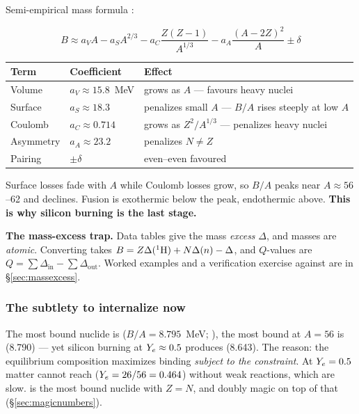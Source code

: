 Semi-empirical mass formula \citep[][this coefficient set is the least-squares
fit of \citealt{eisberg1985}]{krane1988}:

\begin{equation*}
B \approx a_V A - a_S A^{2/3} - a_C \frac{Z(Z-1)}{A^{1/3}}
        - a_A \frac{(A-2Z)^2}{A} \pm \delta
\end{equation*}

\begin{center}
\small
\begin{tabularx}{\textwidth}{@{}l l Y@{}}
\toprule
\textbf{Term} & \textbf{Coefficient} & \textbf{Effect} \\
\midrule
Volume    & $a_V \approx 15.8$~MeV & grows as $A$ --- favours heavy nuclei \\
Surface   & $a_S \approx 18.3$     & penalizes small $A$ --- $B/A$ rises
                                     steeply at low $A$ \\
Coulomb   & $a_C \approx 0.714$    & grows as $Z^2/A^{1/3}$ --- penalizes heavy
                                     nuclei \\
Asymmetry & $a_A \approx 23.2$     & penalizes $N \neq Z$ \\
Pairing   & $\pm\delta$            & even--even favoured \\
\bottomrule
\end{tabularx}
\end{center}

Surface losses fade with $A$ while Coulomb losses grow, so $B/A$ peaks near
$A \approx 56$--62 and declines. Fusion is exothermic below the peak,
endothermic above. \textbf{This is why silicon burning is the last stage.}

\begin{warn}
\textbf{The mass-excess trap.} Data tables give the mass \emph{excess} $\Delta$,
and masses are \emph{atomic}. Converting takes
$B = Z\Delta(\nuc{H}{1}) + N\Delta(n) - \Delta$, and $Q$-values are
$Q = \sum\Delta_{\mathrm{in}} - \sum\Delta_{\mathrm{out}}$. Worked examples and
a verification exercise against  are in
\S\ref{sec:massexcess}.
\end{warn}

\subsubsection{The subtlety to internalize now}
\label{sec:constrainedoptimum}

The most bound nuclide is  ($B/A = 8.795$~MeV;
\citealt{fewell1995}), the most bound at $A = 56$ is  (8.790) ---
yet silicon burning at $\Ye \approx 0.5$ produces \textbf{}
(8.643). The reason: the equilibrium composition maximizes binding
\emph{subject to the \Ye{} constraint}. At $\Ye = 0.5$ matter cannot reach
 ($\Ye = 26/56 = 0.464$) without weak reactions, which are slow.
 is the most bound nuclide with $Z = N$, and doubly magic on top of
that (\S\ref{sec:magicnumbers}).

